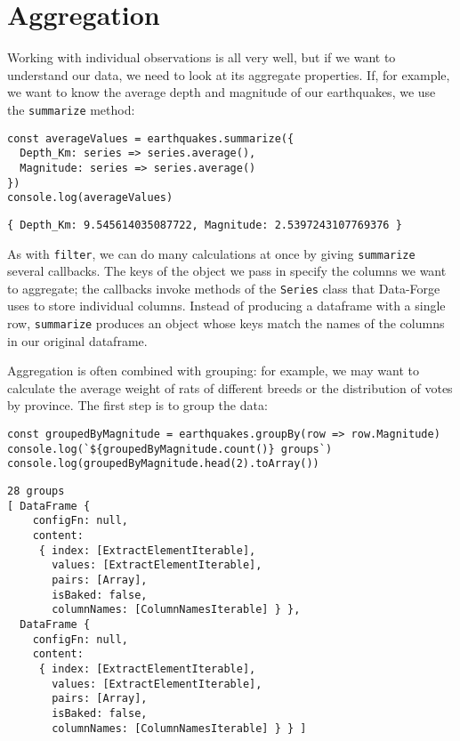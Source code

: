 \section{Aggregation}\label{s:dataforge-aggregate}

Working with individual observations is all very well,
but if we want to understand our data,
we need to look at its aggregate properties.
If,
for example,
we want to know the average depth and magnitude of our earthquakes,
we use the \texttt{summarize} method:

\begin{verbatim}
const averageValues = earthquakes.summarize({
  Depth_Km: series => series.average(),
  Magnitude: series => series.average()
})
console.log(averageValues)
\end{verbatim}

\begin{verbatim}
{ Depth_Km: 9.545614035087722, Magnitude: 2.5397243107769376 }
\end{verbatim}

\noindent
As with \texttt{filter},
we can do many calculations at once by giving \texttt{summarize} several callbacks.
The keys of the object we pass in specify the columns we want to aggregate;
the callbacks invoke methods of the \texttt{Series} class that Data-Forge uses to store individual columns.
Instead of producing a dataframe with a single row,
\texttt{summarize} produces an object whose keys match the names of the columns in our original dataframe.

Aggregation is often combined with grouping:
for example,
we may want to calculate the average weight of rats of different breeds
or the distribution of votes by province.
The first step is to group the data:

\begin{verbatim}
const groupedByMagnitude = earthquakes.groupBy(row => row.Magnitude)
console.log(`${groupedByMagnitude.count()} groups`)
console.log(groupedByMagnitude.head(2).toArray())
\end{verbatim}

\begin{verbatim}
28 groups
[ DataFrame {
    configFn: null,
    content:
     { index: [ExtractElementIterable],
       values: [ExtractElementIterable],
       pairs: [Array],
       isBaked: false,
       columnNames: [ColumnNamesIterable] } },
  DataFrame {
    configFn: null,
    content:
     { index: [ExtractElementIterable],
       values: [ExtractElementIterable],
       pairs: [Array],
       isBaked: false,
       columnNames: [ColumnNamesIterable] } } ]
\end{verbatim}

